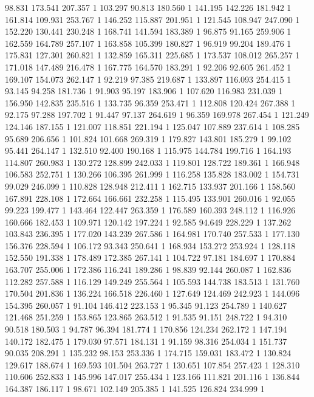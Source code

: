 	98.831	173.541	207.357	1
	103.297	90.813	180.560	1
	141.195	142.226	181.942	1
	161.814	109.931	253.767	1
	146.252	115.887	201.951	1
	121.545	108.947	247.090	1
	152.220	130.441	230.248	1
	168.741	141.594	183.389	1
	96.875	91.165	259.906	1
	162.559	164.789	257.107	1
	163.858	105.399	180.827	1
	96.919	99.204	189.476	1
	175.831	127.301	260.821	1
	132.859	165.311	225.685	1
	173.537	108.012	265.257	1
	171.018	147.489	216.478	1
	167.775	164.570	183.291	1
	92.206	92.605	261.452	1
	169.107	154.073	262.147	1
	92.219	97.385	219.687	1
	133.897	116.093	254.415	1
	93.145	94.258	181.736	1
	91.903	95.197	183.906	1
	107.620	116.983	231.039	1
	156.950	142.835	235.516	1
	133.735	96.359	253.471	1
	112.808	120.424	267.388	1
	92.175	97.288	197.702	1
	91.447	97.137	264.619	1
	96.359	169.978	267.454	1
	121.249	124.146	187.155	1
	121.007	118.851	221.194	1
	125.047	107.889	237.614	1
	108.285	95.689	206.656	1
	101.824	101.668	269.319	1
	179.827	143.801	185.279	1
	99.102	95.441	264.147	1
	132.510	92.400	190.168	1
	115.975	144.784	199.716	1
	164.193	114.807	260.983	1
	130.272	128.899	242.033	1
	119.801	128.722	189.361	1
	166.948	106.583	252.751	1
	130.266	106.395	261.999	1
	116.258	135.828	183.002	1
	154.731	99.029	246.099	1
	110.828	128.948	212.411	1
	162.715	133.937	201.166	1
	158.560	167.891	228.108	1
	172.664	166.661	232.258	1
	115.495	133.901	260.016	1
	92.055	99.223	199.477	1
	143.464	122.447	263.359	1
	176.589	160.393	248.112	1
	116.926	160.666	182.453	1
	109.971	120.142	197.224	1
	92.585	94.649	228.229	1
	137.262	103.843	236.395	1
	177.020	143.239	267.586	1
	164.981	170.740	257.533	1
	177.130	156.376	228.594	1
	106.172	93.343	250.641	1
	168.934	153.272	253.924	1
	128.118	152.550	191.338	1
	178.489	172.385	267.141	1
	104.722	97.181	184.697	1
	170.884	163.707	255.006	1
	172.386	116.241	189.286	1
	98.839	92.144	260.087	1
	162.836	112.282	257.588	1
	116.129	149.249	255.564	1
	105.593	144.738	183.513	1
	131.760	170.504	201.836	1
	136.224	166.518	226.460	1
	127.649	124.469	242.923	1
	144.096	154.395	260.057	1
	91.104	146.412	223.153	1
	95.345	91.123	254.789	1
	140.627	121.468	251.259	1
	153.865	123.865	263.512	1
	91.535	91.151	248.722	1
	94.310	90.518	180.503	1
	94.787	96.394	181.774	1
	170.856	124.234	262.172	1
	147.194	140.172	182.475	1
	179.030	97.571	184.131	1
	91.159	98.316	254.034	1
	151.737	90.035	208.291	1
	135.232	98.153	253.336	1
	174.715	159.031	183.472	1
	130.824	129.617	188.674	1
	169.593	101.504	263.727	1
	130.651	107.854	257.423	1
	128.310	110.606	252.833	1
	145.996	147.017	255.434	1
	123.166	111.821	201.116	1
	136.844	164.387	186.117	1
	98.671	102.149	205.385	1
	141.525	126.824	234.999	1
